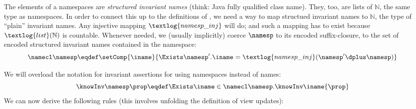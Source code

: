 The elements of a namespaces are \emph{structured invariant names} (think: Java fully qualified class name).
They, too, are lists of $\mathbb N$, the same type as namespaces.
In order to connect this up to the definitions of , we need a way to map structued invariant names to $\mathbb N$, the type of ``plain'' invariant names.
Any injective mapping $\textlog{namesp\_inj}$ will do; and such a mapping has to exist because $\textlog{list}(\mathbb N)$ is countable.
Whenever needed, we (usually implicitly) coerce $\namesp$ to its encoded suffix-closure, \ie to the set of encoded structured invariant names contained in the namespace: \[\namecl\namesp \eqdef \setComp{\iname}{\Exists \namesp'. \iname = \textlog{namesp\_inj}(\namesp' \dplus \namesp)}\]

We will overload the notation for invariant assertions for using namespaces instead of names:
\[ \knowInv\namesp\prop \eqdef \Exists \iname \in \namecl\namesp. \knowInv\iname{\prop} \]
We can now derive the following rules (this involves unfolding the definition of view updates):


